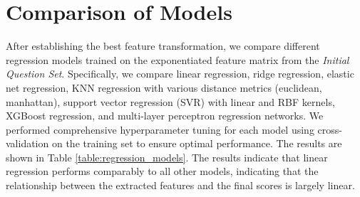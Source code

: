 \documentclass{report}
\begin{document}
\begin{table}[h]
\centering
{}
\caption{Performance comparison of linear models using different feature transformations applied to the \emph{Initial Question Set}.}
\label{table:feature_transformations}
\end{table}

\section{Comparison of Models}
\label{sec:comparison_of_models}
After establishing the best feature transformation, we compare different regression models trained on the exponentiated feature matrix from the \emph{Initial Question Set}. Specifically, we compare linear regression, ridge regression, elastic net regression, KNN regression with various distance metrics (euclidean, manhattan), support vector regression (SVR) with linear and RBF kernels, XGBoost regression, and multi-layer perceptron regression networks. We performed comprehensive hyperparameter tuning for each model using cross-validation on the training set to ensure optimal performance. The results are shown in Table \ref{table:regression_models}. The results indicate that linear regression performs comparably to all other models, indicating that the relationship between the extracted features and the final scores is largely linear.
\end{document}
